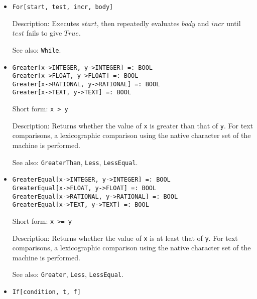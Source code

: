 \begin{itemize}
\item
\protect \large \begin{verbatim}
For[start, test, incr, body]
\end{verbatim}\normalsize

\bd
\item
[Description:] Executes $start$, then repeatedly evaluates $body$ and $incr$
until $test$ fails to give $True$.
\item
[See also:] \verb+While+.
\ed


\item
\protect \large \begin{verbatim}
Greater[x->INTEGER, y->INTEGER] =: BOOL
Greater[x->FLOAT, y->FLOAT] =: BOOL
Greater[x->RATIONAL, y->RATIONAL] =: BOOL
Greater[x->TEXT, y->TEXT] =: BOOL
\end{verbatim}\normalsize

\bd
\item
[Short form:] \verb+x > y+
\item
[Description:] Returns whether the value of \verb+x+ is greater than
that of \verb+y+.  For text comparisons, a lexicographic comparison using the
native character set of the machine is performed.
\item
[See also:] {\tt GreaterThan}, {\tt Less}, {\tt LessEqual}.
\ed

\item
\protect \large \begin{verbatim}
GreaterEqual[x->INTEGER, y->INTEGER] =: BOOL
GreaterEqual[x->FLOAT, y->FLOAT] =: BOOL
GreaterEqual[x->RATIONAL, y->RATIONAL] =: BOOL
GreaterEqual[x->TEXT, y->TEXT] =: BOOL
\end{verbatim}\normalsize

\bd
\item
[Short form:] \verb+x >= y+
\item
[Description:] Returns whether the value of \verb+x+ is at least that of
\verb+y+.  For text comparisons, a lexicographic comparison using the
native character set of the machine is performed.
\item
[See also:] {\tt Greater}, {\tt Less}, {\tt LessEqual}.
\ed



\item 
\protect \large \begin{verbatim}
If[condition, t, f]
\end{verbatim} \normalsize
  

\end{itemize}
